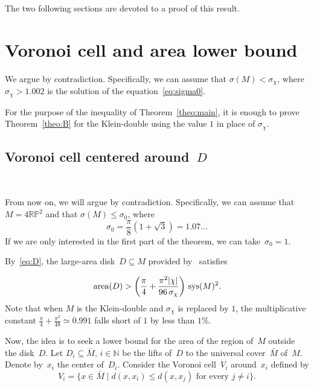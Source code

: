 \documentclass[12pt,reqno]{amsart}
\theoremstyle{definition}
\numberwithin{equation}{section}
\newcommand\N {{\mathbb N}}
\DeclareMathOperator{\area}{{\rm area}}
\DeclareMathOperator{\sys}{{\rm sys}}
\newcommand{\RP}{{\mathbb R\mathbb P}}
\numberwithin{equation}{section}
\begin{document}
The two following sections are devoted to a proof of this
result.


\section{Voronoi cell and area lower bound}

We argue by contradiction.  Specifically, we can assume that
$\sigma(M) < \sigma_\chi$, where $\sigma_\chi > 1.002$ is the solution
of the equation~\eqref{eq:sigma0}.

For the purpose of the inequality of Theorem~\ref{theo:main}, it is
enough to prove Theorem~\ref{theo:B} for the Klein-double using the
value $1$ in place of $\sigma_\chi$.


\subsection{Voronoi cell centered around~$D$}

\mbox{ } \medskip

\forget
From now on, we will argue by contradiction.
Specifically, we can assume that $M=4 \RP^2$ and that $\sigma(M) \leq \sigma_0$, where 
\[
\sigma_0=\frac{\pi}{8}(1+\sqrt{3})=1.07...
\]
If we are only interested in the first part of the theorem, we can take~$\sigma_0=1$.
\forgotten

By~\eqref{eq:D}, the large-area disk~$D \subseteq M$ provided by~\cite{KS24} satisfies

\begin{equation} \label{eq:48}
\area(D) > \left( \frac{\pi}{4} + \frac{\pi^2 |\chi|}{96 \,
  \sigma_\chi} \right) \, \sys(M)^2.
\end{equation}
Note that when $M$ is the Klein-double and $\sigma_\chi$ is replaced
by $1$, the multiplicative constant $\frac{\pi}{4} + \frac{\pi^2}{48}
\simeq 0.991$ falls short of $1$ by less than $1\%$.

Now, the idea is to seek a lower bound for the area of the region
of~$M$ outside the disk~$D$.  Let $D_i \subseteq \bar{M},\, i \in \N$
be the lifts of~$D$ to the universal cover~$\bar{M}$ of~$M$.  Denote
by~$x_i$ the center of~$D_i$.  Consider the Voronoi cell~$V_i$
around~$x_i$ defined by
\[
V_i = \{ x \in \bar{M} \mid d(x,x_i) \leq d(x,x_j) \textrm{ for every } j \neq i \}.
\]
\end{document}
